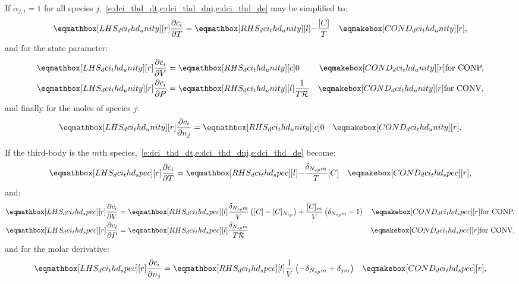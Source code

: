 \documentclass[12pt,number,sort&compress]{elsarticle}
\newcommand{\ns}{N_{sp}}
\newcommand{\conp}{CONP}
\newcommand{\conv}{CONV}
\newcommand{\dconp}{\ifmmode\text{for \conp,}\else for \conp,\fi}
\newcommand{\dconv}{\ifmmode\text{for \conv,}\else for \conv,\fi}
\newcommand{\Ru}{\mathcal{R}}
\begin{document}
If $\alpha_{j,i} = 1$ for all species $j$,~\cref{e:dci_thd_dt,e:dci_thd_dnj,e:dci_thd_de} may be simplified to:
\begin{align}
 \lhs{dci_thd_unity}{\frac{\partial c_{i} }{\partial T }} &= \rhs{dci_thd_unity}{- \frac{[C]}{T}}& \cond{dci_thd_unity}{,} \label{e:dci_thd_unity_dt}
\end{align}
and for the state parameter:
\begin{subequations}
 \label{e:dci_thd_unity_de}
 \begin{align}
  \lhs{dci_thd_unity}{\frac{\partial c_{i} }{\partial V }} &= \rhs{dci_thd_unity}{0}[c] & \cond{dci_thd_unity}{\dconp} \\
  \lhs{dci_thd_unity}{\frac{\partial c_{i} }{\partial P }} &= \rhs{dci_thd_unity}{\frac{1}{T \Ru}}& \cond{dci_thd_unity}{\dconv}
 \end{align}
\end{subequations}
and finally for the moles of species $j$:
\begin{align}
  \lhs{dci_thd_unity}{\frac{\partial c_{i} }{\partial n_{j} }} &= \rhs{dci_thd_unity}{0}[c] & \cond{dci_thd_unity}{,}
\end{align}


If the third-body is the $m$th species,~\cref{e:dci_thd_dt,e:dci_thd_dnj,e:dci_thd_de} become:
\begin{align}
 \lhs{dci_thd_spec}{\frac{\partial c_{i} }{\partial T }} &= \rhs{dci_thd_spec}{-\frac{\delta_{\ns m}}{T} [C]}&\cond{dci_thd_spec}{,} \label{e:dci_thd_spec_dt}
\end{align}
and:
\begin{subequations}
\label{e:dci_thd_spec_de}
\begin{align}
\lhs{dci_thd_spec}{\frac{\partial c_{i} }{\partial V }} &= \rhs{dci_thd_spec}{\frac{\delta_{\ns m}}{V} \left([C] - [C]_{\ns}\right) + \frac{[C]_{m}}{V} \left(\delta_{\ns m} - 1\right)} & \cond{dci_thd_spec}{\dconp} \\
\lhs{dci_thd_spec}{\frac{\partial c_{i} }{\partial P }} &= \rhs{dci_thd_spec}{\frac{\delta_{\ns m}}{T \Ru}} & \cond{dci_thd_spec}{\dconv}
\end{align}
\end{subequations}
and for the molar derivative:
\begin{align}
 \lhs{dci_thd_spec}{\frac{\partial c_{i} }{\partial n_j }} &= \rhs{dci_thd_spec}{\frac{1}{V} \left(- \delta_{\ns m} + \delta_{j m}\right)}&\cond{dci_thd_spec}{,} \label{e:dci_thd_spec_dnj}
\end{align}
\end{document}
